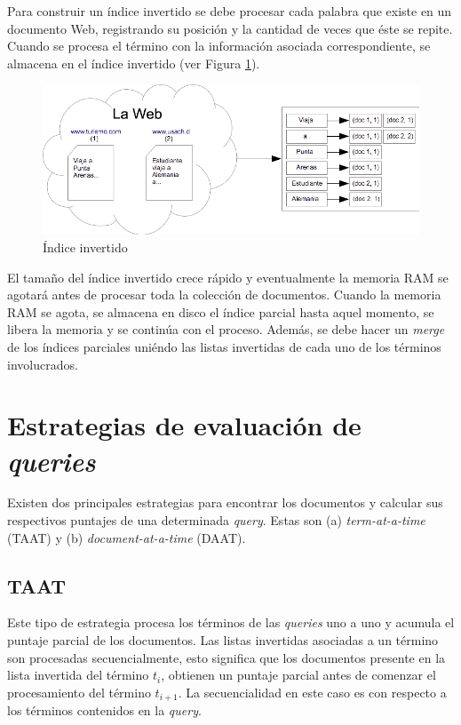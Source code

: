 Para construir un índice invertido se debe procesar cada palabra que existe en un documento Web, registrando su posición y la cantidad de veces que éste se repite. Cuando se procesa el término con la información asociada correspondiente, se almacena en el índice invertido (ver Figura \ref{fig:invertedindex}).

\begin{figure}[tp]
\centering
\includegraphics[scale=.75]{images/invertedindex.png}
\caption{\'Indice invertido}
\label{fig:invertedindex}
\end{figure}

El tamaño del índice invertido crece rápido y eventualmente la memoria RAM se agotará antes de procesar toda la colección de documentos. Cuando la memoria RAM se agota, se almacena en disco el índice parcial hasta aquel momento, se libera la memoria y se continúa con el proceso. Además, se debe hacer un \textit{merge} de los índices parciales uniéndo las listas invertidas de cada uno de los términos involucrados.

\section{Estrategias de evaluaci\'on de \textit{queries}}
\label{marco:eeq}
Existen dos principales estrategias para encontrar los documentos y calcular sus respectivos puntajes de una determinada \textit{query}. Estas son (a) \textit{term-at-a-time} (TAAT) y (b) \textit{document-at-a-time} (DAAT).

\subsection{TAAT}
Este tipo de estrategia procesa los términos de las \textit{queries} uno a uno y acumula el puntaje parcial de los documentos. Las listas invertidas asociadas a un término son procesadas secuencialmente, esto significa que los documentos presente en la lista invertida del término $t_{i}$, obtienen un puntaje parcial antes de comenzar el procesamiento del término $t_{i+1}$. La secuencialidad en este caso es con respecto a los términos contenidos en la \textit{query}.

